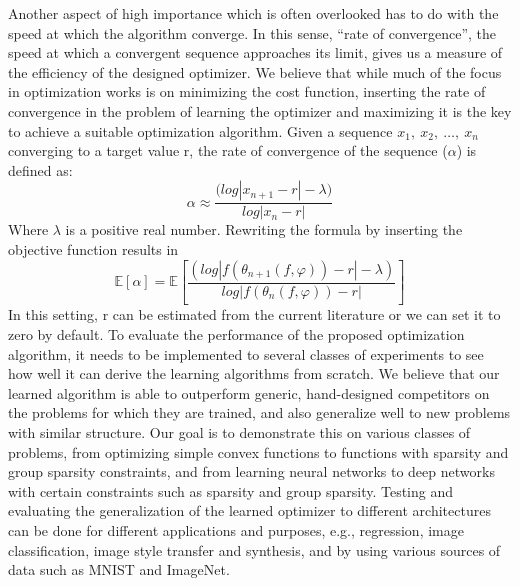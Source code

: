 \documentclass[a4paper, 11pt]{article}
\begin{document}
Another aspect of high importance which is often overlooked has to do with the speed at which the algorithm converge.  In this sense, \enquote{rate of convergence}, the speed at which a convergent sequence approaches its limit, gives us a measure of the efficiency of the designed optimizer. We believe that while much of the focus in optimization works is on minimizing the cost function, inserting the rate of convergence in the problem of learning the optimizer and maximizing it is the key to achieve a suitable optimization algorithm. 
Given a sequence $x_1,\ x_2,\ \ldots,\ x_n$ converging to a target value r, the rate of convergence of the sequence ($\alpha$) is defined as:
$$\alpha\approx\frac{(log{|x_{n+1}-r|-\lambda)}}{log{|x_n-r|}}$$ 
Where $\lambda$ is a positive real number. Rewriting the formula by inserting the objective function results in
$$\mathbb{E}[\alpha]=\mathbb{E}\left[\frac{(log|f(\theta_{n+1}(f,\varphi))-r|-\lambda)}{log|f(\theta_n (f,\varphi))-r|}\right]$$
In this setting, r can be estimated from the current literature or we can set it to zero by default. 
To evaluate the performance of the proposed optimization algorithm, it needs to be implemented to several classes of experiments to see how well it can derive the learning algorithms from scratch. We believe that our learned algorithm is able to outperform generic, hand-designed competitors on the problems for which they are trained, and also generalize well to new problems with similar structure. Our goal is to demonstrate this on various classes of problems, from optimizing simple convex functions to functions with sparsity and group sparsity constraints, and from learning neural networks to deep networks with certain constraints such as sparsity and group sparsity. Testing and evaluating the generalization of the learned optimizer to different architectures can be done for different applications and purposes, e.g., regression, image classification, image style transfer and synthesis, and by using various sources of data such as MNIST and ImageNet. 
\end{document}
